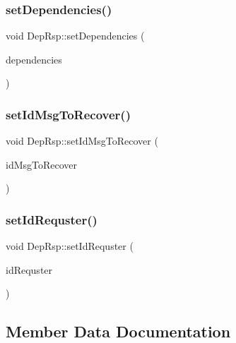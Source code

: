\subsubsection{\texorpdfstring{set\+Dependencies()}{setDependencies()}}
{\footnotesize\ttfamily void Dep\+Rsp\+::set\+Dependencies (\begin{DoxyParamCaption}\item[{const \hyperlink{depRsp__m_8h_a3c2ceb107008eb344443aaab2eb872b8}{id\+Dep\+Dep\+Rsp} \&}]{dependencies }\end{DoxyParamCaption})\hspace{0.3cm}{\ttfamily [virtual]}}

\mbox{\label{classDepRsp_a6aea88bdf4ba7b9c4876823278e880b0}} 
\subsubsection{\texorpdfstring{set\+Id\+Msg\+To\+Recover()}{setIdMsgToRecover()}}
{\footnotesize\ttfamily void Dep\+Rsp\+::set\+Id\+Msg\+To\+Recover (\begin{DoxyParamCaption}\item[{const \hyperlink{depRsp__m_8h_a8a41011e0821f196429cd4bc45638bcf}{id\+Msg\+Dep\+Rsp} \&}]{id\+Msg\+To\+Recover }\end{DoxyParamCaption})\hspace{0.3cm}{\ttfamily [virtual]}}

\mbox{\label{classDepRsp_a7029f3c6f0e1b230965a0143a3c9724e}} 
\subsubsection{\texorpdfstring{set\+Id\+Requster()}{setIdRequster()}}
{\footnotesize\ttfamily void Dep\+Rsp\+::set\+Id\+Requster (\begin{DoxyParamCaption}\item[{unsigned int}]{id\+Requster }\end{DoxyParamCaption})\hspace{0.3cm}{\ttfamily [virtual]}}



\subsection{Member Data Documentation}
\mbox{\label{classDepRsp_a9b383b175e0b581e1558b2dc34a21b7a}} 
